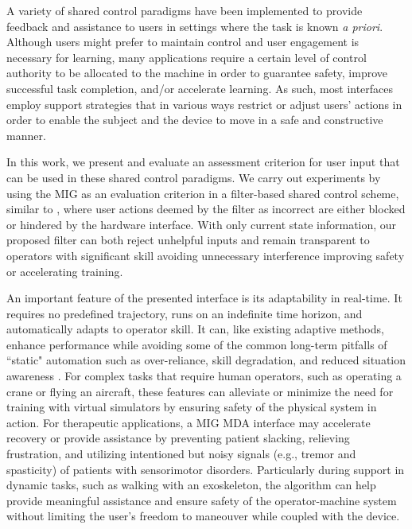 
A variety of shared control paradigms have been implemented to provide feedback and assistance to users in settings where the task is known \textit{a priori}. Although users might prefer to maintain control and user engagement is necessary for learning, many applications require a certain level of control authority to be allocated to the machine in order to guarantee safety, improve successful task completion, and/or accelerate learning. As such, most interfaces employ support strategies that in various ways restrict or adjust users' actions in order to enable the subject and the device to move in a safe and constructive manner. 

In this work, we present and evaluate an assessment criterion for user input that can be used in these shared control paradigms. We carry out experiments by using the MIG as an evaluation criterion in a filter-based shared control scheme, similar to \cite{hapticsharedcontrol_review, MDA_Katie}, where user actions deemed by the filter as incorrect are either blocked or hindered by the hardware interface. With only current state information, our proposed filter can both reject unhelpful inputs and remain transparent to operators with significant skill avoiding unnecessary interference improving safety or accelerating training. 

An important feature of the presented interface is its adaptability in real-time. It requires no predefined trajectory, runs on an indefinite time horizon, and automatically adapts to operator skill. It can, like existing adaptive methods, enhance performance while avoiding some of the common long-term pitfalls of ``static" automation such as over-reliance, skill degradation, and reduced situation awareness \cite{adaptive_review}. For complex tasks that require human operators, such as operating a crane or flying an aircraft, these features can alleviate or minimize the need for training with virtual simulators by ensuring safety of the physical system in action. For therapeutic applications, a MIG MDA interface may accelerate recovery or provide assistance by preventing patient slacking, relieving frustration, and utilizing intentioned but noisy signals (e.g., tremor and spasticity) of patients with sensorimotor disorders. Particularly during support in dynamic tasks, such as walking with an exoskeleton, the algorithm can help provide meaningful assistance and ensure safety of the operator-machine system without limiting the user's freedom to maneouver while coupled with the device. 

